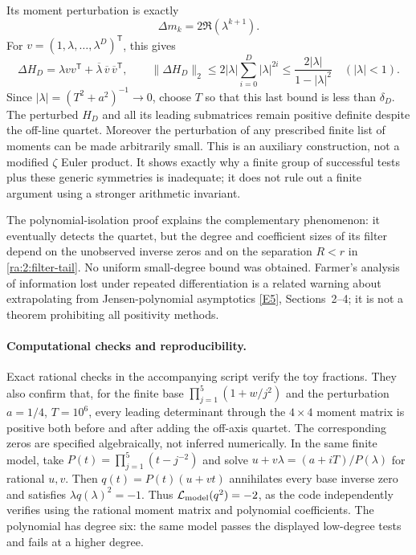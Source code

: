 \documentclass[11pt]{article}
\newcommand{\eref}[2]{\hyperlink{extra:#1:#2}{[E#2]}}
\begin{document}
Its moment perturbation is exactly
\[
 \Delta m_k=2\Re(\lambda^{k+1}).
\]
For $v=(1,\lambda,\ldots,\lambda^D)^{\mathsf T}$, this gives
\[
 \Delta H_D=\lambda vv^{\mathsf T}
           +\overline\lambda\,\overline v\,\overline v^{\mathsf T},
 \qquad
 \|\Delta H_D\|_2\le
      2|\lambda|\sum_{i=0}^D|\lambda|^{2i}
      \le\frac{2|\lambda|}{1-|\lambda|^2}\quad(|\lambda|<1).
\]
Since $|\lambda|=(T^2+a^2)^{-1}\to0$, choose $T$ so that this last bound
is less than $\delta_D$. The perturbed $H_D$ and all its leading submatrices
remain positive definite despite the off-line quartet. Moreover the
perturbation of any prescribed finite list of moments can be made arbitrarily
small. This is an auxiliary construction, not a modified $\zeta$ Euler product.
It shows exactly why a finite group of successful tests plus these generic
symmetries is inadequate; it does not rule out a finite argument using a
stronger arithmetic invariant.

The polynomial-isolation proof explains the complementary phenomenon:
it eventually detects the quartet, but the degree and coefficient sizes of
its filter depend on the unobserved inverse zeros and on the separation
$R<r$ in \eqref{ra:2:filter-tail}. No uniform small-degree bound was obtained.
Farmer's analysis of information lost under repeated differentiation is a
related warning about extrapolating from Jensen-polynomial asymptotics
\eref{2}{5}, Sections~2--4; it is not a theorem prohibiting all positivity
methods.

\paragraph{Computational checks and reproducibility.}
Exact rational checks in the accompanying script verify the toy fractions.
They also confirm that, for the
finite base $\prod_{j=1}^5(1+w/j^2)$ and the perturbation
$a=1/4$, $T=10^6$, every leading determinant through the $4\times4$ moment
matrix is positive both before and after adding the off-axis quartet.
The corresponding zeros are specified algebraically, not inferred numerically.
In the same finite model, take
$P(t)=\prod_{j=1}^5(t-j^{-2})$ and solve
$u+v\lambda=(a+iT)/P(\lambda)$ for rational $u,v$.
Then $q(t)=P(t)(u+vt)$ annihilates every base inverse zero and satisfies
$\lambda q(\lambda)^2=-1$. Thus
$\mathcal L_{\rm model}(q^2)=-2$, as the code independently verifies using
the rational moment matrix and polynomial coefficients. The polynomial has
degree six: the same model passes the displayed low-degree tests and fails
at a higher degree.
\end{document}
